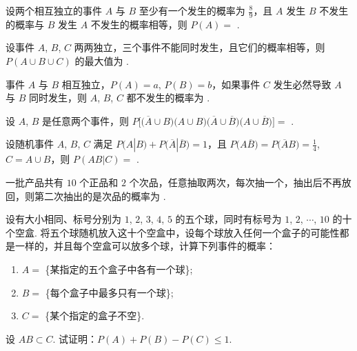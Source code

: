 	\begin{titwo}
		设两个相互独立的事件 $A$ 与 $B$ 至少有一个发生的概率为 $\frac{8}{9}$，且 $A$ 发生 $B$ 不发生的概率与 $B$ 发生 $A$ 不发生的概率相等，则 $P(A) = $ \htwo.
	\end{titwo}

	\begin{titwo}
		设事件 $A$, $B$, $C$ 两两独立，三个事件不能同时发生，且它们的概率相等，则 $P(A \cup B \cup C)$ 的最大值为 \htwo.
	\end{titwo}

	\begin{titwo}
		事件 $A$ 与 $B$ 相互独立，$P(A) = a$, $P(B) = b$，如果事件 $C$ 发生必然导致 $A$ 与 $B$ 同时发生，则 $A$, $B$, $C$ 都不发生的概率为 \htwo.
	\end{titwo}

	\begin{titwo}
		设 $A$, $B$ 是任意两个事件，则 $P \bigl[ \bigl( \overline{A} \cup B \bigr) \bigl( A \cup B \bigr) \bigl( \overline{A} \cup \overline{B} \bigr) \bigl( A \cup \overline{B} \bigr) \bigr] = $ \htwo.
	\end{titwo}

	\begin{titwo}
		设随机事件 $A$, $B$, $C$ 满足 $P(A|B) + P \bigl( \overline{A} | \overline{B} \bigr) = 1$，且 $P\bigl( A \overline{B} \bigr) = P\bigl( \overline{A} B \bigr) = \frac{1}{4}$, $C = A \cup B$，则 $P(AB|C) = $ \htwo.
	\end{titwo}

	\begin{titwo}
		一批产品共有 $10$ 个正品和 $2$ 个次品，任意抽取两次，每次抽一个，抽出后不再放回，则第二次抽出的是次品的概率为 \htwo.
	\end{titwo}

	\begin{titwo}
		设有大小相同、标号分别为 $1$, $2$, $3$, $4$, $5$ 的五个球，同时有标号为 $1$, $2$, $\cdots$, $10$ 的十个空盒. 将五个球随机放入这十个空盒中，设每个球放入任何一个盒子的可能性都是一样的，并且每个空盒可以放多个球，计算下列事件的概率：
		\begin{enumerate}
			\item $A = $ \{某指定的五个盒子中各有一个球\};
			\item $B = $ \{每个盒子中最多只有一个球\};
			\item $C = $ \{某个指定的盒子不空\}.
		\end{enumerate}
	\end{titwo}

	\begin{titwo}
		设 $AB \subset C$. 试证明：$P(A) + P(B) - P(C) \leq 1$.
	\end{titwo}

